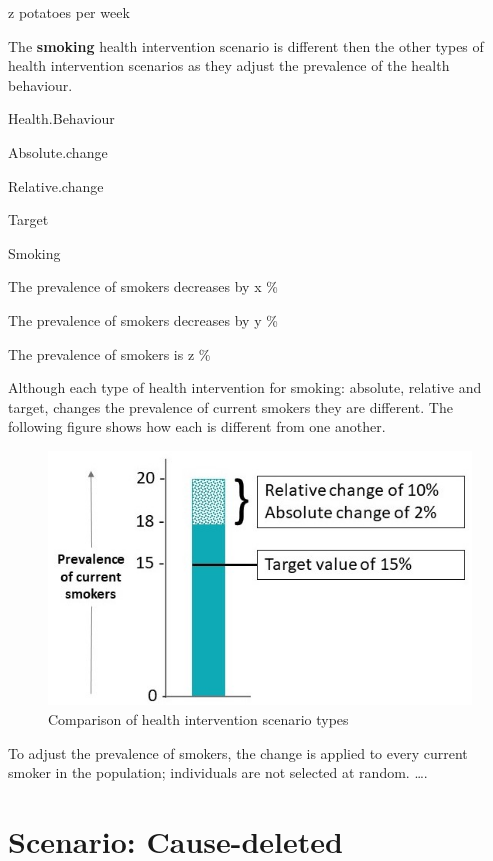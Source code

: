 \documentclass[]{book}
\begin{document}
z potatoes per week

The \textbf{smoking} health intervention scenario is different then the
other types of health intervention scenarios as they adjust the
prevalence of the health behaviour.

Health.Behaviour

Absolute.change

Relative.change

Target

Smoking

The prevalence of smokers decreases by x \%

The prevalence of smokers decreases by y \%

The prevalence of smokers is z \%

Although each type of health intervention for smoking: absolute,
relative and target, changes the prevalence of current smokers they are
different. The following figure shows how each is different from one
another.

\begin{figure}

{\centering \includegraphics{Scenario-Abs, Rel, Target cropped} 

}

\caption{Comparison of health intervention scenario types}\label{fig:unnamed-chunk-10}
\end{figure}

To adjust the prevalence of smokers, the change is applied to every
current smoker in the population; individuals are not selected at
random. \ldots{}.

\section{Scenario: Cause-deleted}\label{scenario-cause-deleted}
\end{document}

